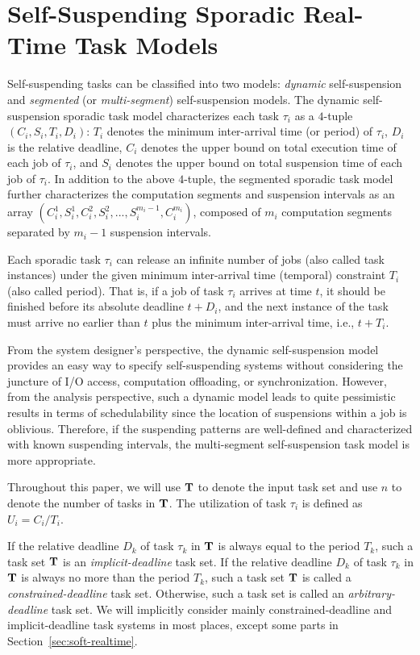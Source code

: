 \section{Self-Suspending Sporadic Real-Time Task Models}
\label{sec:model}
  
Self-suspending tasks can be classified into two models: \emph{dynamic} self-suspension and \emph{segmented} (or \emph{multi-segment}) self-suspension models. 
The dynamic self-suspension sporadic task model characterizes each
task $\tau_i$ as a $4$-tuple $(C_i,S_i,T_i,D_i)$: $T_i$ denotes the minimum inter-arrival time (or period) of $\tau_i$, $D_i$ is the relative deadline,
$C_i$ denotes the upper bound on total execution time of each job of $\tau_i$,
and $S_i$ denotes the upper bound on total suspension time of each job of $\tau_i$.  In addition to the above $4$-tuple, the segmented sporadic task model further 
characterizes the computation segments and suspension intervals as an array
$(C_{i}^1,S_{i}^1,C_{i}^2,S_{i}^2,...,S_{i}^{m_i-1},C_{i}^{m_i})$, composed of $m_i$ computation segments separated by $m_i-1$ suspension intervals. 

Each sporadic task $\tau_i$ can release an infinite number of jobs
(also called task instances) under the given minimum inter-arrival
time (temporal) constraint $T_i$ (also called period).  That is, if a
job of task $\tau_i$ arrives at time $t$, it should be finished before
its absolute deadline $t+D_i$, and  the next instance of
the task must arrive no earlier than $t$ plus the minimum
inter-arrival time, i.e., $t + T_i$.

From the system designer's perspective, the dynamic self-suspension model provides an easy way to specify self-suspending systems without considering the juncture of I/O access, computation offloading, or synchronization. 
However, from the analysis perspective, such a  dynamic model leads to quite pessimistic results in terms of schedulability since the location of suspensions within a job is oblivious. Therefore, if the suspending patterns are well-defined and characterized with known suspending intervals, the multi-segment self-suspension task model is more appropriate.   


Throughout this paper, we will use ${\bf T}$ to denote the input task
set and use $n$ to denote the number of tasks in ${\bf T}$. The
utilization of task $\tau_i$ is defined as $U_i=C_i/T_i$.

If the relative deadline $D_k$ of task $\tau_k$ in ${\bf T}$ is always
equal to the period $T_k$, such a task set ${\bf T}$ is an
\emph{implicit-deadline} task set. If the relative deadline $D_k$ of
task $\tau_k$ in ${\bf T}$ is always no more than the period $T_k$,
such a task set ${\bf T}$ is called a \emph{constrained-deadline} task
set. Otherwise, such a task set is called an \emph{arbitrary-deadline}
task set. We will implicitly consider mainly constrained-deadline and
implicit-deadline task systems in most places, except some parts in
Section~\ref{sec:soft-realtime}.

